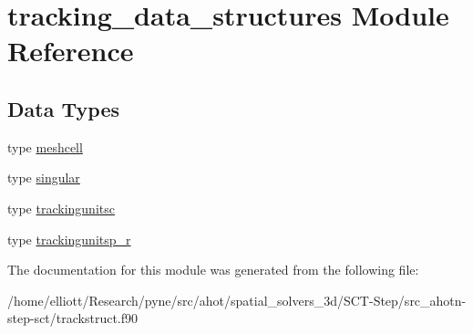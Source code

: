 \hypertarget{classtracking__data__structures}{\section{tracking\-\_\-data\-\_\-structures Module Reference}
\label{classtracking__data__structures}
}
\subsection*{Data Types}
\begin{DoxyCompactItemize}
\item 
type \hyperlink{structtracking__data__structures_1_1meshcell}{meshcell}
\item 
type \hyperlink{structtracking__data__structures_1_1singular}{singular}
\item 
type \hyperlink{structtracking__data__structures_1_1trackingunitsc}{trackingunitsc}
\item 
type \hyperlink{structtracking__data__structures_1_1trackingunitsp__r}{trackingunitsp\-\_\-r}
\end{DoxyCompactItemize}


The documentation for this module was generated from the following file\-:\begin{DoxyCompactItemize}
\item 
/home/elliott/\-Research/pyne/src/ahot/spatial\-\_\-solvers\-\_\-3d/\-S\-C\-T-\/\-Step/src\-\_\-ahotn-\/step-\/sct/trackstruct.\-f90\end{DoxyCompactItemize}
